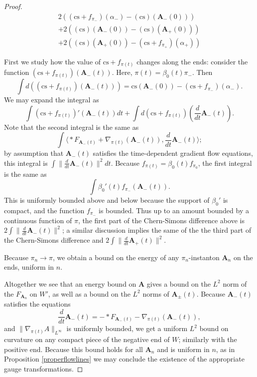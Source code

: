 \documentclass[10pt,a4paper]{amsart}
\theoremstyle{definition}
\theoremstyle{remark}
\numberwithin{figure}{qchap}
\begin{document}
\begin{proof}
\begin{align*}2\left((\text{cs}+f_{\pi_-})(\alpha_-) - (\text{cs})(\mathbf{A}_-(0))\right)\\
+ 2\left((\text{cs})(\mathbf{A}_-(0)) - (\text{cs})(\mathbf{A}_+(0))\right)\\
+ 2\left((\text{cs})(\mathbf{A}_+(0)) - (\text{cs}+f_{\pi_+})(\alpha_+)\right)\end{align*}

First we study how the value of $\text{cs}+f_{\pi(t)}$ changes along the ends: consider the function $(\text{cs}+f_{\pi(t)})(\mathbf{A}_-(t))$. Here, $\pi(t) = \beta_0(t) \pi_-$. Then 
$$\int d\left((\text{cs}+f_{\pi(t)})(\mathbf{A}_-(t))\right) = \text{cs}(\mathbf{A}_-(0)) - (\text{cs}+f_{\pi_-})(\alpha_-).$$
We may expand the integral as 
$$\int (\text{cs}+f_{\pi(t)})'(\mathbf{A}_-(t)) dt + \int d(\text{cs}+f_{\pi(t)})\left(\frac{d}{dt} \mathbf{A}_-(t)\right).$$ 
Note that the second integral is the same as 
$$\int \big\langle *F_{\mathbf{A}_-(t)} + \nabla_{\pi(t)}(\mathbf{A}_-(t)), \frac{d}{dt} \mathbf{A}_-(t)\big\rangle;$$ 
by assumption that $\mathbf{A}_-(t)$ satisfies the time-dependent gradient flow equations, this integral is $\int \|\frac{d}{dt} \mathbf{A}_-(t)\|^2 dt$. Because $f_{\pi(t)} = \beta_0(t) f_{\pi_0}$, the first integral is the same as 
$$\int \beta_0'(t) f_{\pi_-}(\mathbf{A}_-(t)).$$ 
This is uniformly bounded above and below because the support of $\beta_0'$ is compact, and the function $f_{\pi_-}$ is bounded. Thus up to an amount bounded by a continuous function of $\pi$, the first part of the Chern-Simons difference above is $2\int \|\frac{d}{dt} \mathbf{A}_-(t)\|^2$; a similar discussion implies the same of the the third part of the Chern-Simons difference and $2\int \|\frac{d}{dt} \mathbf{A}_+(t)\|^2$.

Because $\pi_n \to \pi$, we obtain a bound on the energy of any $\pi_n$-instanton $\mathbf{A}_n$ on the ends, uniform in $n$. 

Altogether we see that an energy bound on $\mathbf{A}$ gives a bound on the $L^2$ norm of the $F_{\mathbf{A}_n}$ on $W'$, as well as a bound on the $L^2$ norms of $\mathbf{A}_\pm(t)$. Because $\mathbf{A}_-(t)$ satisfies the equations 
$$\frac{d}{dt} \mathbf{A}_-(t) = -*F_{\mathbf{A}_-(t)} - \nabla_{\pi(t)}(\mathbf{A}_-(t)),$$ 
and $\|\nabla_{\pi(t)} A\|_{L^\infty}$ is uniformly bounded, we get a uniform $L^2$ bound on curvature on any compact piece of the negative end of $W$; similarly with the positive end. Because this bound holds for all $\mathbf{A}_n$ and is uniform in $n$, as in Proposition \ref{properflowlines} we may conclude the existence of the appropriate gauge transformations. 


\end{proof}
\end{document}
